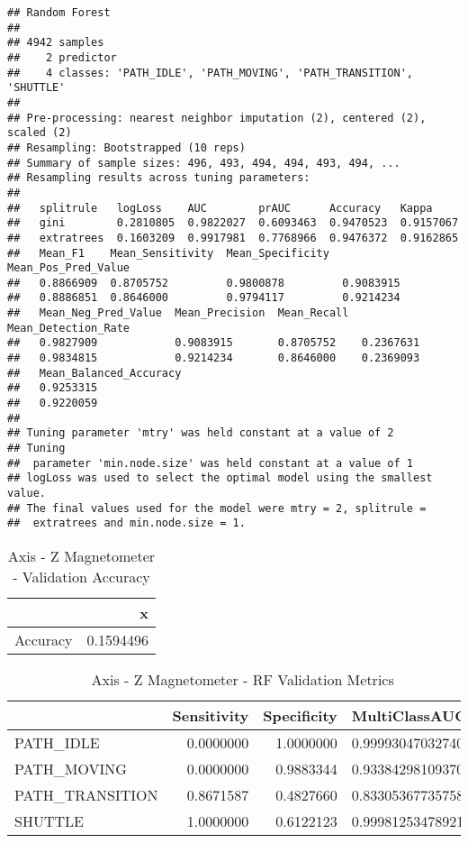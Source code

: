 \documentclass[]{article}
\begin{document}
\begin{verbatim}
## Random Forest 
## 
## 4942 samples
##    2 predictor
##    4 classes: 'PATH_IDLE', 'PATH_MOVING', 'PATH_TRANSITION', 'SHUTTLE' 
## 
## Pre-processing: nearest neighbor imputation (2), centered (2), scaled (2) 
## Resampling: Bootstrapped (10 reps) 
## Summary of sample sizes: 496, 493, 494, 494, 493, 494, ... 
## Resampling results across tuning parameters:
## 
##   splitrule   logLoss    AUC        prAUC      Accuracy   Kappa    
##   gini        0.2810805  0.9822027  0.6093463  0.9470523  0.9157067
##   extratrees  0.1603209  0.9917981  0.7768966  0.9476372  0.9162865
##   Mean_F1    Mean_Sensitivity  Mean_Specificity  Mean_Pos_Pred_Value
##   0.8866909  0.8705752         0.9800878         0.9083915          
##   0.8886851  0.8646000         0.9794117         0.9214234          
##   Mean_Neg_Pred_Value  Mean_Precision  Mean_Recall  Mean_Detection_Rate
##   0.9827909            0.9083915       0.8705752    0.2367631          
##   0.9834815            0.9214234       0.8646000    0.2369093          
##   Mean_Balanced_Accuracy
##   0.9253315             
##   0.9220059             
## 
## Tuning parameter 'mtry' was held constant at a value of 2
## Tuning
##  parameter 'min.node.size' was held constant at a value of 1
## logLoss was used to select the optimal model using the smallest value.
## The final values used for the model were mtry = 2, splitrule =
##  extratrees and min.node.size = 1.
\end{verbatim}

\begin{table}[!h]

\caption{\label{tab:sensor-z-mag-rf-results}Axis - Z Magnetometer - Validation Accuracy}
\centering
\begin{tabular}[t]{lr}
\toprule
  & x\\
\midrule
Accuracy & 0.1594496\\
\bottomrule
\end{tabular}
\end{table}

\begin{table}[!h]

\caption{\label{tab:sensor-z-mag-rf-results}Axis - Z Magnetometer - RF Validation Metrics}
\centering
\begin{tabular}[t]{lrrl}
\toprule
  & Sensitivity & Specificity & MultiClassAUC\\
\midrule
PATH\_IDLE & 0.0000000 & 1.0000000 & 0.999930470327408\\
PATH\_MOVING & 0.0000000 & 0.9883344 & 0.933842981093705\\
PATH\_TRANSITION & 0.8671587 & 0.4827660 & 0.833053677357583\\
SHUTTLE & 1.0000000 & 0.6122123 & 0.999812534789217\\
\bottomrule
\end{tabular}
\end{table}
\end{document}
